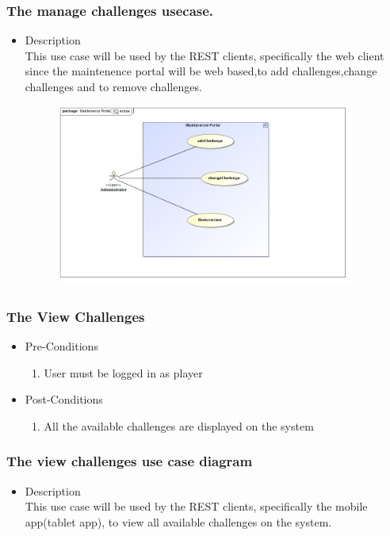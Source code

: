 \documentclass[english]{article}
\begin{document}
			\subsubsection* {The manage challenges usecase.}
			\begin{itemize}
			   \item Description\\
				This use case will be used by the REST clients, specifically the web client since the maintenence portal will be web based,to add challenges,change       challenges and to remove challenges.
			\end{itemize}
			\includegraphics[width=14cm,height=6cm,keepaspectratio]{Challenge.jpg}	
		
		\subsubsection{The View Challenges}
		
			\begin{itemize}
	
		
		\item Pre-Conditions
			\begin{enumerate}
				\item User must be logged in as player
				
			\end{enumerate}
		\item Post-Conditions
			\begin{enumerate}
			\item All the available challenges are displayed on the system
						
			\end{enumerate}
	

		\end{itemize}
		
		
		\subsubsection* {The view challenges use case diagram}
		\begin{itemize}
			\item Description\\
			This use case will be used by the REST clients, specifically the mobile app(tablet app), to view all available challenges on the system.
		\end{itemize}
		
\end{document}

